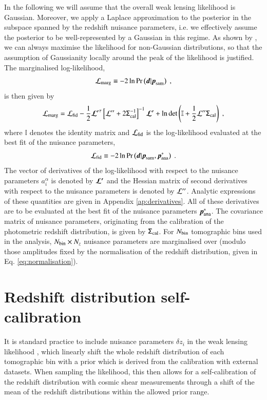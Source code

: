 \documentclass{aa}
\newcommand{\eq}[1]{\begin{equation}  #1 \end{equation}}
\newcommand{\br}[1]{\left( #1 \right)}
\newcommand{\bb}[1]{\left[ #1 \right]}
\newcommand{\pr}{{\rm Pr}}
\begin{document}
In the following we will assume that the overall weak lensing likelihood is Gaussian. Moreover, we apply a Laplace approximation to the posterior in the subspace spanned by the redshift nuisance parameters, i.e. we effectively assume the posterior to be well-represented by a Gaussian in this regime. As shown by \cite{taylor10}, we can always maximise the likelihood for non-Gaussian distributions, so that the assumption of Gaussianity locally around the peak of the likelihood is justified. The marginalised log-likelihood,
\eq{
{\cal L}_{\rm marg}  \equiv -2 \ln \pr \br{\boldsymbol{d} | \boldsymbol{p}_{\rm sam}}\;,
}
is then given by \citep{bridle02, taylor10}
\eq{
\label{eq:marginal_likelihood}
{\cal L}_{\rm marg} = {\cal L}_{\rm fid} - \frac{1}{2} \boldsymbol{\cal L^\prime}^\tau  \bb{ {\cal L^{\prime\prime}} + 2 \tens{\Sigma}^{-1}_{\rm cal} }^{-1} \boldsymbol{\cal L^\prime} + \ln \det \br{ \mathbb{I} + \frac{1}{2} {\cal L^{\prime\prime}} \tens{\Sigma}_{\rm cal}}\;,
}
where $\mathbb{I}$ denotes the identity matrix and ${\cal L}_{\rm fid}$ is the log-likelihood evaluated at the best fit of the nuisance parameters,
\eq{
{\cal L}_{\rm fid} \equiv -2 \ln \pr \br{\boldsymbol{d} | \boldsymbol{p}_{\rm sam}, \boldsymbol{p}^*_{\rm ana}}\;.
}
The vector of derivatives of the log-likelihood with respect to the nuisance parameters $a_i^\alpha$ is denoted by $\boldsymbol{\cal L^\prime}$ and the Hessian matrix of second derivatives with respect to the nuisance parameters is denoted by ${\cal L^{\prime\prime}}$. Analytic expressions of these quantities are given in Appendix \ref{ap:derivatives}. All of these derivatives are to be evaluated at the best fit of the nuisance parameters $\boldsymbol{p}^*_{\rm ana}$. The covariance matrix of nuisance parameters, originating from the calibration of the photometric redshift distribution, is given by $\mathsf{\Sigma}_{\rm cal} $.
For $N_{\rm bin}$ tomographic bins used in the analysis, $N_{\rm bin} \times N_z$ nuisance parameters are marginalised over (modulo those amplitudes fixed by the normalisation of the redshift distribution, given in Eq. \eqref{eq:normalisation}).

\section{Redshift distribution self-calibration}
\label{sec:calibration}
It is standard practice to include nuisance parameters $\delta z_i$ in the weak lensing likelihood \citep{DES3, HSC2, asgari20}, which linearly shift the whole redshift distribution of each tomographic bin with a prior which is derived from the calibration with external datasets. When sampling the likelihood, this then allows for a self-calibration of the redshift distribution with cosmic shear measurements through a shift of the mean of the redshift distributions within the allowed prior range. 
\end{document}
